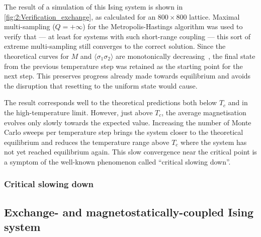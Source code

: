 The result of a \hotspice simulation of this Ising system is shown in \cref{fig:2:Verification_exchange}, as calculated for an $800 \times 800$ lattice.
Maximal multi-sampling ($Q=+\infty$) for the Metropolis-Hastings algorithm was used to verify that --- at least for systems with such short-range coupling --- this sort of extreme multi-sampling still converges to the correct solution.
Since the theoretical curves for $M$ and $\langle \sigma_{1} \sigma_{2} \rangle$ are monotonically decreasing~\cite{MCinStatPhys}, the final state from the previous temperature step was retained as the starting point for the next step. This preserves progress already made towards equilibrium and avoids the disruption that resetting to the uniform state would cause. \par


The \hotspice result corresponds well to the theoretical predictions both below $T_c$ and in the high-temperature limit.
However, just above $T_c$, the average magnetisation evolves only slowly towards the expected value.
Increasing the number of Monte Carlo sweeps per temperature step brings the system closer to the theoretical equilibrium and reduces the temperature range above $T_c$ where the system has not yet reached equilibrium again.
This slow convergence near the critical point is a symptom of the well-known phenomenon called ``critical slowing down''.

\subsubsection{Critical slowing down}
\subsection{Exchange- and magnetostatically-coupled Ising system}
